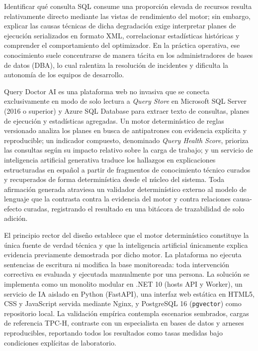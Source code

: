 \documentclass[12pt,a4paper]{article}
\begin{document}
Identificar qué consulta SQL consume una proporción elevada de recursos resulta relativamente directo mediante las vistas de rendimiento del motor; sin embargo, explicar las causas técnicas de dicha degradación exige interpretar planes de ejecución serializados en formato XML, correlacionar estadísticas históricas y comprender el comportamiento del optimizador. En la práctica operativa, ese conocimiento suele concentrarse de manera tácita en los administradores de bases de datos (DBA), lo cual ralentiza la resolución de incidentes y dificulta la autonomía de los equipos de desarrollo.

Query Doctor AI es una plataforma web no invasiva que se conecta exclusivamente en modo de solo lectura a \textit{Query Store} en Microsoft SQL Server (2016 o superior) y Azure SQL Database para extraer texto de consultas, planes de ejecución y estadísticas agregadas. Un motor determinístico de reglas versionado analiza los planes en busca de antipatrones con evidencia explícita y reproducible; un indicador compuesto, denominado \textit{Query Health Score}, prioriza las consultas según su impacto relativo sobre la carga de trabajo; y un servicio de inteligencia artificial generativa traduce los hallazgos en explicaciones estructuradas en español a partir de fragmentos de conocimiento técnico curados y recuperados de forma determinística desde el núcleo del sistema. Toda afirmación generada atraviesa un validador determinístico externo al modelo de lenguaje que la contrasta contra la evidencia del motor y contra relaciones causa-efecto curadas, registrando el resultado en una bitácora de trazabilidad de solo adición.

El principio rector del diseño establece que el motor determinístico constituye la única fuente de verdad técnica y que la inteligencia artificial únicamente explica evidencia previamente demostrada por dicho motor. La plataforma no ejecuta sentencias de escritura ni modifica la base monitoreada: toda intervención correctiva es evaluada y ejecutada manualmente por una persona. La solución se implementa como un monolito modular en .NET 10 (hosts API y Worker), un servicio de IA aislado en Python (FastAPI), una interfaz web estática en HTML5, CSS y JavaScript servida mediante Nginx, y PostgreSQL 16 (\texttt{pgvector}) como repositorio local. La validación empírica contempla escenarios sembrados, cargas de referencia TPC-H, contraste con un especialista en bases de datos y arneses reproducibles, reportando todos los resultados como tasas medidas bajo condiciones explícitas de laboratorio.
\end{document}
